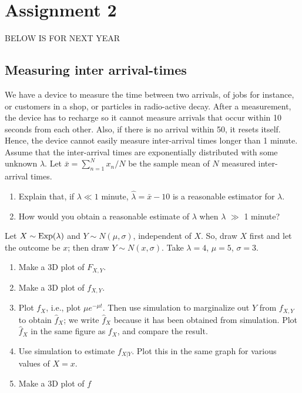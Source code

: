 \documentclass[../../assignments/assignments]{subfiles}
\begin{document}
\section{Assignment 2}



BELOW IS FOR NEXT YEAR

\subsection{Measuring inter arrival-times}

We have a device to measure the time between two arrivals, of jobs for instance, or customers in a shop, or particles in radio-active decay.
After a measurement, the device has to recharge so it cannot measure arrivals that occur within 10 seconds from each other.
Also, if there is no arrival within 50, it resets itself.
Hence, the device cannot easily measure inter-arrival times longer than 1 minute. Assume that the inter-arrival times are exponentially distributed with some unknown \(\lambda\). Let \(\bar x = \sum_{n=1}^N x_{n} /N\) be the sample mean of \(N\) measured inter-arrival times.

\begin{enumerate}
\item Explain that, if \(\lambda \ll 1\) minute,  \(\hat \lambda = \bar x - 10\) is a reasonable estimator for \(\lambda\).
\item How would you obtain a reasonable estimate of \(\lambda\) when \(\lambda\) \(\gg\) 1 minute?
\end{enumerate}



\begin{todo}
Let $X\sim\mathrm{Exp}(\lambda)$ and $Y \sim N(\mu, \sigma)$, independent of $X$.
So, draw $X$ first and let the outcome be $x$; then draw $Y\sim N(x, \sigma)$.
Take $\lambda=4$, $\mu = 5$, $\sigma=3$.
\begin{enumerate}
\item Make a 3D plot of $F_{X,Y}$.
\item Make a 3D plot of $f_{X,Y}$.
\item Plot $f_{X}$, i.e., plot $\mu e^{-\mu t}$.
  Then use simulation to marginalize out $Y$ from $f_{X,Y}$ to obtain $\hat f_X$; we write $\hat f_X$ because it has been obtained from simulation.
  Plot $\hat f_X$ in the same figure as $f_X$, and compare the result.
\item Use simulation to estimate $f_{X|Y}$. Plot this in the same graph for various values of $X=x$.
\item Make a 3D plot of $f$
\end{enumerate}
\end{todo}
\end{document}

